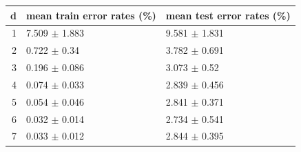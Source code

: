 \begin{tabular}{rll}
\toprule
d & mean train error rates (\%) & mean test error rates (\%) \\
\midrule
1 & 7.509 $\pm$ 1.883 & 9.581 $\pm$ 1.831 \\
2 & 0.722 $\pm$ 0.34 & 3.782 $\pm$ 0.691 \\
3 & 0.196 $\pm$ 0.086 & 3.073 $\pm$ 0.52 \\
4 & 0.074 $\pm$ 0.033 & 2.839 $\pm$ 0.456 \\
5 & 0.054 $\pm$ 0.046 & 2.841 $\pm$ 0.371 \\
6 & 0.032 $\pm$ 0.014 & 2.734 $\pm$ 0.541 \\
7 & 0.033 $\pm$ 0.012 & 2.844 $\pm$ 0.395 \\
\bottomrule
\end{tabular}
